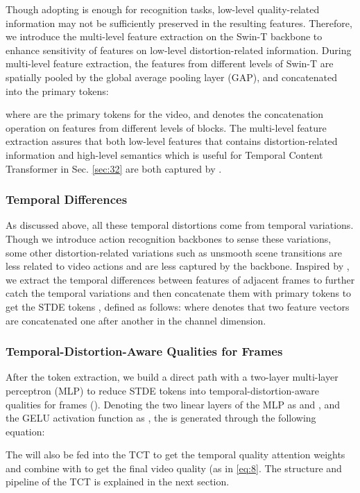 \documentclass[journal]{IEEEtran}
\begin{document}
Though adopting  is enough for recognition tasks, low-level quality-related information may not be sufficiently preserved in the resulting features. Therefore, we introduce the multi-level feature extraction on the Swin-T backbone to enhance sensitivity of features on low-level distortion-related information.
During multi-level feature extraction, the features from different levels of Swin-T  are spatially pooled by the global average pooling layer ({GAP}), and concatenated into the primary tokens:
 
where  are the primary tokens for the video, and  denotes the concatenation operation on features from different levels of blocks.
The multi-level feature extraction assures that both low-level features that contains distortion-related information and high-level semantics which is useful for Temporal Content Transformer in Sec. \ref{sec:32} are both captured by .   








\subsubsection{Temporal Differences} As discussed above, all these temporal distortions come from temporal variations. Though we introduce action recognition backbones to sense these variations, some other distortion-related variations such as unsmooth scene transitions are less related to video actions and are less captured by the backbone. Inspired by \cite{deepvqa,tlvqm}, we extract the temporal differences between features of adjacent frames to further catch the temporal variations and then concatenate them with primary tokens  to get the STDE tokens , defined as follows:
 where  denotes that two feature vectors are concatenated one after another in the channel dimension.


\subsubsection{Temporal-Distortion-Aware Qualities for Frames} After the token extraction, we build a direct path with a two-layer multi-layer perceptron (MLP) to reduce STDE tokens  into temporal-distortion-aware qualities for frames (). Denoting the two linear layers of the MLP as  and , and the GELU activation function as , the  is generated through the following equation:



The  will also be fed into the TCT to get the temporal quality attention weights and combine with  to get the final video quality (as in \cref{eq:8}. The structure and pipeline of the TCT is explained in the next section.
\end{document}
